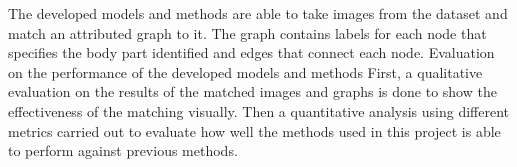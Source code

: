\newcommand{\fourplotall}[4] {
\begin{minipage}{0.48\textwidth}
	\centering
	#1
\end{minipage}
\hspace*{\fill}
\begin{minipage}{0.48\textwidth}
	\centering
	#2
\end{minipage}
\n
\begin{minipage}{0.48\textwidth}
	\centering
	#3
\end{minipage}
\hspace*{\fill}
\begin{minipage}{0.48\textwidth}
	\centering
	#4
\end{minipage}
}

\newcommand{\fourplot}[3]{
\begin{minipage}{0.48\textwidth}
	\centering
	#1{#2}{0.3}{#3}
\end{minipage}
\hspace*{\fill}
\begin{minipage}{0.48\textwidth}
	\centering
	#1{#2}{0.5}{#3}
\end{minipage}
\n
\begin{minipage}{0.48\textwidth}
	\centering
	#1{#2}{0.7}{#3}
\end{minipage}
\hspace*{\fill}
\begin{minipage}{0.48\textwidth}
	\centering
	#1{#2}{0.9}{#3}
\end{minipage}
}

\newcommand{\fourplotlabel}[4]{
\begin{minipage}{0.48\textwidth}
	\centering
	#1{#2}{0.3}{#3}{#4}
\end{minipage}
\hspace*{\fill}
\begin{minipage}{0.48\textwidth}
	\centering
	#1{#2}{0.5}{#3}{#4}
\end{minipage}
\n
\begin{minipage}{0.48\textwidth}
	\centering
	#1{#2}{0.7}{#3}{#4}
\end{minipage}
\hspace*{\fill}
\begin{minipage}{0.48\textwidth}
	\centering
	#1{#2}{0.9}{#3}{#4}
\end{minipage}
}


The developed models and methods are able to take images from the dataset and match an attributed graph to it. The graph contains labels for each node that specifies the body part identified and edges that connect each node. Evaluation on the performance of the developed models and methods First, a qualitative evaluation on the results of the matched images and graphs is done to show the effectiveness of the matching visually. Then a quantitative analysis using different metrics carried out to evaluate how well the methods used in this project is able to perform against previous methods.

